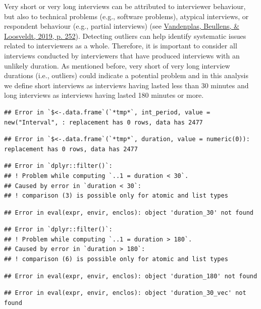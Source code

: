 \documentclass[
  11pt,
  a4paperpaper,
]{article}
\begin{document}
Very short or very long interviews can be attributed to interviewer
behaviour, but also to technical problems (e.g., software problems),
atypical interviews, or respondent behaviour (e.g., partial interviews)
(see \protect\hyperlink{ref-vandenplas2019}{Vandenplas, Beullens, \&
Loosveldt, 2019, p. 252}). Detecting outliers can help identify
systematic issues related to interviewers as a whole. Therefore, it is
important to consider all interviews conducted by interviewers that have
produced interviews with an unlikely duration. As mentioned before, very
short of very long interview durations (i.e., outliers) could indicate a
potential problem and in this analysis we define short interviews as
interviews having lasted less than 30 minutes and long interviews as
interviews having lasted 180 minutes or more.

\begin{verbatim}
## Error in `$<-.data.frame`(`*tmp*`, int_period, value = new("Interval", : replacement has 0 rows, data has 2477
\end{verbatim}

\begin{verbatim}
## Error in `$<-.data.frame`(`*tmp*`, duration, value = numeric(0)): replacement has 0 rows, data has 2477
\end{verbatim}

\begin{verbatim}
## Error in `dplyr::filter()`:
## ! Problem while computing `..1 = duration < 30`.
## Caused by error in `duration < 30`:
## ! comparison (3) is possible only for atomic and list types
\end{verbatim}

\begin{verbatim}
## Error in eval(expr, envir, enclos): object 'duration_30' not found
\end{verbatim}

\begin{verbatim}
## Error in `dplyr::filter()`:
## ! Problem while computing `..1 = duration > 180`.
## Caused by error in `duration > 180`:
## ! comparison (6) is possible only for atomic and list types
\end{verbatim}

\begin{verbatim}
## Error in eval(expr, envir, enclos): object 'duration_180' not found
\end{verbatim}

\begin{verbatim}
## Error in eval(expr, envir, enclos): object 'duration_30_vec' not found
\end{verbatim}
\end{document}
